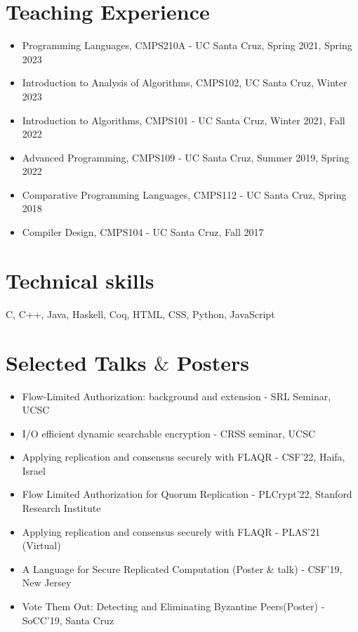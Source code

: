 \documentclass[9pt,a4paper]{moderncv}
\begin{document}
\section{Teaching Experience}
\begin{itemize}
\item Programming Languages, CMPS210A - UC Santa Cruz, Spring 2021, Spring 2023 
\item Introduction to Analysis of Algorithms, CMPS102, UC Santa Cruz, Winter 2023
\item Introduction to Algorithms, CMPS101 - UC Santa Cruz, Winter 2021, Fall 2022
\item Advanced Programming, CMPS109 - UC Santa Cruz, Summer 2019, Spring 2022
\item Comparative Programming Languages, CMPS112 - UC Santa Cruz, Spring 2018
\item Compiler Design, CMPS104 - UC Santa Cruz, Fall 2017
\end{itemize}
\section{Technical skills}
\hspace{-0.1cm} {C, C++, Java, Haskell, Coq, HTML, CSS, Python, JavaScript}
\hspace{-0.1cm}
\section{Selected Talks $\&$ Posters}
\begin{itemize}
\item Flow-Limited Authorization: background and extension - SRL Seminar, UCSC
\item I/O efficient dynamic searchable encryption - CRSS seminar, UCSC
\item Applying replication and consensus securely with FLAQR - CSF'22, Haifa, Israel
\item Flow Limited Authorization for Quorum Replication - PLCrypt'22, Stanford Research Institute
\item Applying replication and consensus securely with FLAQR - PLAS'21 (Virtual)%
\item A Language for Secure Replicated Computation (Poster \& talk) - CSF'19, New Jersey
\item Vote Them Out: Detecting and Eliminating Byzantine Peers(Poster) - SoCC'19, Santa Cruz 
\end{itemize}
\end{document}
